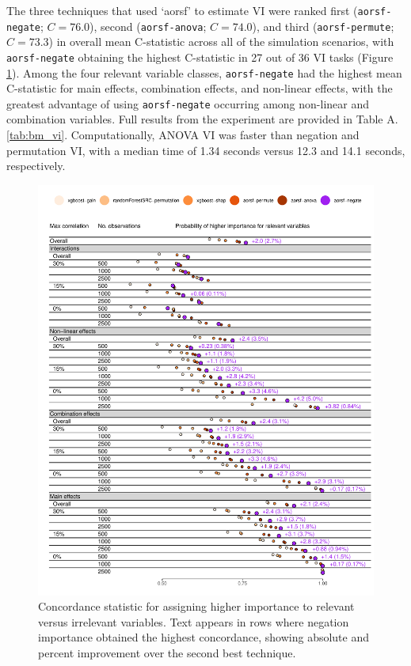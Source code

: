 \documentclass[twoside,11pt]{article}\usepackage[]{graphicx}\usepackage[]{xcolor}
\makeatletter
\def\maxwidth{ %
  \ifdim\Gin@nat@width>\linewidth
    \linewidth
  \else
    \Gin@nat@width
  \fi
}
\newenvironment{knitrout}{}{} %
\newcommand{\tabrefAppendix}[1]{Table A.\ref{#1}}
\makeatother
\begin{document}
The three techniques that used `aorsf' to estimate VI were ranked first (\texttt{aorsf-negate}; $C = 76.0$), second (\texttt{aorsf-anova}; $C = 74.0$), and third (\texttt{aorsf-permute}; $C = 73.3$) in overall mean C-statistic across all of the simulation scenarios, with \texttt{aorsf-negate} obtaining the highest C-statistic in 27 out of 36 VI tasks (Figure \ref{fig:bm_vi_viz}). Among the four relevant variable classes, \texttt{aorsf-negate} had the highest mean C-statistic for main effects, combination effects, and non-linear effects, with the greatest advantage of using \texttt{aorsf-negate} occurring among non-linear and combination variables. Full results from the experiment are provided in \tabrefAppendix{tab:bm_vi}. Computationally, ANOVA VI was faster than negation and permutation VI, with a median time of 1.34 seconds versus 12.3 and 14.1 seconds, respectively.

\begin{knitrout}
\color{fgcolor}\begin{figure}
\includegraphics[width=\maxwidth]{figure/bm_vi_viz-1} \caption[Concordance statistic for assigning higher importance to relevant versus irrelevant variables]{Concordance statistic for assigning higher importance to relevant versus irrelevant variables. Text appears in rows where negation importance obtained the highest concordance, showing absolute and percent improvement over the second best technique.}\label{fig:bm_vi_viz}
\end{figure}

\end{knitrout}
\end{document}
